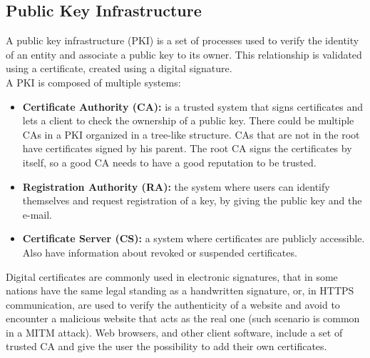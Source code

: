 \subsection{Public Key Infrastructure}
A public key infrastructure (PKI) is a set of processes used to verify the identity of an entity and associate a public key to its owner. This relationship is validated using a certificate, created using a digital signature.\\
A PKI is composed of multiple systems:
\begin{itemize}
    \item{\textbf{Certificate Authority (CA):} is a trusted system that signs certificates and lets a client to check the ownership of a public key. There could be multiple CAs in a PKI organized in a tree-like structure. CAs that are not in the root have certificates signed by his parent. The root CA signs the certificates by itself, so a good CA needs to have a good reputation to be trusted.}
    \item{\textbf{Registration Authority (RA):} the system where users can identify themselves and request registration of a key, by giving the public key and the e-mail.}
    \item{\textbf{Certificate Server (CS):} a system where certificates are publicly accessible. Also have information about revoked or suspended certificates.}
\end{itemize}
Digital certificates are commonly used in electronic signatures, that in some nations have the same legal standing as a handwritten signature, or, in HTTPS communication, are used to verify the authenticity of a website and avoid to encounter a malicious website that acts as the real one (such scenario is common in a MITM attack). Web browsers, and other client software, include a set of trusted CA and give the user the possibility to add their own certificates.
